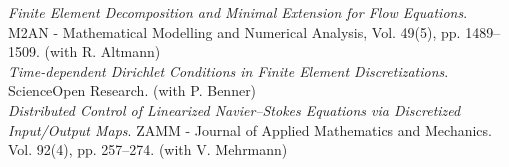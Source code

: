 \newpage

 \emph{Finite Element Decomposition and Minimal Extension for Flow Equations}. M2AN - Mathematical Modelling and Numerical Analysis, Vol. 49(5), pp. 1489--1509. (with R. Altmann) \\ %

 \emph{Time-dependent Dirichlet Conditions in Finite Element Discretizations}. ScienceOpen Research. (with P. Benner) \\ %

 \emph{Distributed Control of Linearized Navier--Stokes Equations via Discretized Input/Output Maps}. ZAMM - Journal of Applied Mathematics and Mechanics. Vol. 92(4), pp. 257--274. (with V. Mehrmann) \\ %


